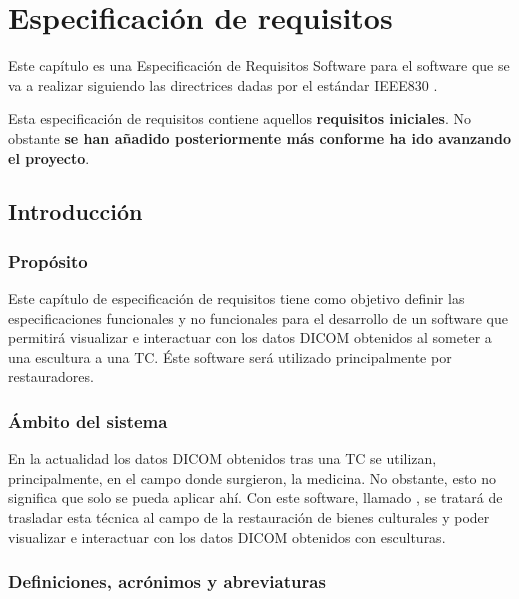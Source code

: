 \chapter{Especificación de requisitos}

Este capítulo es una Especificación de Requisitos Software para el software que se va a realizar siguiendo las directrices dadas por el estándar IEEE830 \cite{iee830}.

Esta especificación de requisitos contiene aquellos \textbf{requisitos iniciales}. No obstante \textbf{se han añadido posteriormente más conforme ha ido avanzando el proyecto}.

\section{Introducción}

	\subsection{Propósito}
	
	Este capítulo de especificación de requisitos tiene como objetivo definir las especificaciones funcionales y no funcionales para el desarrollo de un software que permitirá visualizar e interactuar con los datos DICOM obtenidos al someter a una escultura a una TC. Éste software será utilizado principalmente por restauradores.
	
	\subsection{Ámbito del sistema}
	
	En la actualidad los datos DICOM obtenidos tras una TC se utilizan, principalmente, en el campo donde surgieron, la medicina. No obstante, esto no significa que solo se pueda aplicar ahí. Con este software, llamado \myTitle, se tratará de trasladar esta técnica al campo de la restauración de bienes culturales y poder visualizar e interactuar con los datos DICOM obtenidos con esculturas.
	
	\subsection{Definiciones, acrónimos y abreviaturas}
	
